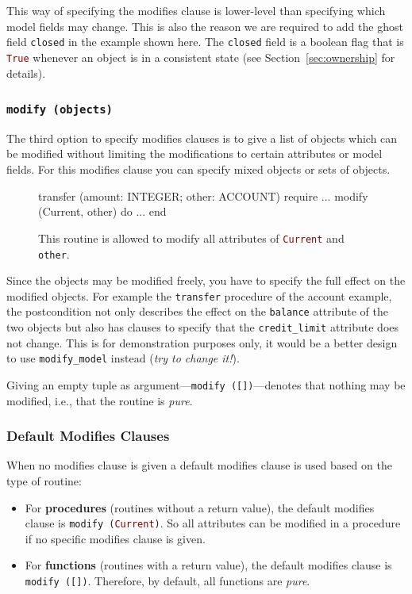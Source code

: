 \documentclass[a4paper,12pt]{article}
\newcommand{\e}[1]{\mbox{\lstinline[language=Eiffel]|#1|}}
\begin{document}
This way of specifying the modifies clause is lower-level than specifying which model fields may change. This is also the reason we are required to add the ghost field \e{closed} in the example shown here. The \e{closed} field is a boolean flag that is \e{True} whenever an object is in a consistent state (see Section~\ref{sec:ownership} for details).

\subsubsection*{\e{modify (objects)}}

The third option to specify modifies clauses is to give a list of objects which can be modified without limiting the modifications to certain attributes or model fields. For this modifies clause you can specify mixed objects or sets of objects.

\begin{figure}
\begin{erunning}
transfer (amount: INTEGER; other: ACCOUNT)
	require
		...
		modify (Current, other)
	do ... end
\end{erunning}
\hspace{0.5cm}
\caption*{This routine is allowed to modify all attributes of \e{Current} and \e{other}.}
\end{figure}

Since the objects may be modified freely, you have to specify the full effect on the modified objects. For example the \e{transfer} procedure of the account example, the postcondition not only describes the effect on the \e{balance} attribute of the two objects but also has clauses to specify that the \e{credit_limit} attribute does not change. This is for demonstration purposes only, it would be a better design to use \e{modify_model} instead (\emph{try to change it!}).

Giving an empty tuple as argument---\e{modify ([])}---denotes that nothing may be modified, i.e., that the routine is \emph{pure}.

\subsubsection*{Default Modifies Clauses}

When no modifies clause is given a default modifies clause is used based on the type of routine:
\begin{itemize}
\item For \textbf{procedures} (routines without a return value), the default modifies clause is \e{modify (Current)}. So all attributes can be modified in a procedure if no specific modifies clause is given.
\item For \textbf{functions} (routines with a return value), the default modifies clause is \e{modify ([])}. Therefore, by default, all functions are \emph{pure}.
\end{itemize}
\end{document}

